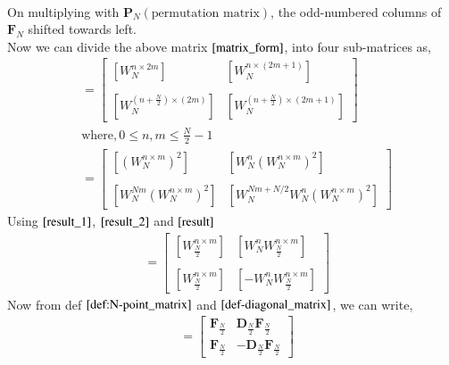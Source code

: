 \documentclass[journal,12pt,twocolumn]{IEEEtran}
\providecommand{\brak}[1]{\ensuremath{\left(#1\right)}}
\providecommand{\sbrak}[1]{\ensuremath{\left[#1\right]}}
\let\vec\mathbf
\numberwithin{equation}{section}
\renewcommand\thesection{\arabic{section}}
\begin{document}
\begin{enumerate}[label=\arabic*.,ref=\thesection.\theenumi]
\begin{align}
 \label{matrix_form}
\end{align}
On multiplying with $\vec{P}_{N} \brak{\text{permutation matrix}}$, the odd-numbered columns of $\vec{F}_{N}$ shifted towards left.\\
 Now we can divide the above matrix $\eqref{matrix_form}$, into four sub-matrices as,
   \begin{align}
   	           & = \begin{bmatrix}
                       \sbrak{W_{N}^{n\times 2m}} & \sbrak{W_{N}^{n\times\brak{2m + 1}}} \\ \\
                       \sbrak{W_{N}^{(n + \frac{N}{2}) \times (2m) }} & \sbrak{W_{N}^{(n + \frac{N}{2}) \times (2m + 1)}}
                    \end{bmatrix}\\
               & \text{where}, 0 \leq n,m \leq \frac{N}{2} - 1 \nonumber \\
               & = \begin{bmatrix}
               	        \sbrak{\brak{W_{N}^{n\times m}}^2} & \sbrak{W_{N}^{n}\brak{W_{N}^{n\times m}}^2} \\ \\
               			\sbrak{W_{N}^{Nm}\brak{W_{N}^{n \times m}}^2} & \sbrak{W_{N}^{Nm + N/2}W_{N}^{n}\brak{W_{N}^{n \times m}}^2}
               	   \end{bmatrix}
   \end{align}
Using $\eqref{result_1}$, $\eqref{result_2}$ and $\eqref{result}$
 \begin{align}
 	  & =  \begin{bmatrix}
 	  	       \sbrak{W_{\frac{N}{2}}^{n\times m}} & \sbrak{W_{N}^{n}W_{\frac{N}{2}}^{n\times m}}\\ \\
 	  	       \sbrak{W_{\frac{N}{2}}^{n\times m}} & \sbrak{-W_{N}^{n}W_{\frac{N}{2}}^{n\times m}}
 	       \end{bmatrix}
 \end{align}
Now from def $\eqref{def:N-point_matrix}$ and $\eqref{def-diagonal_matrix}$, we can write,
  \begin{align}
  	   & =  \begin{bmatrix}
  	  	      \vec{F}_{\frac{N}{2}} &\vec{D}_{\frac{N}{2}}\vec{F}_{\frac{N}{2}}\\
  	  	       \vec{F}_{\frac{N}{2}}& -\vec{D}_{\frac{N}{2}}\vec{F}_{\frac{N}{2}}
  	        \end{bmatrix} \\

\end{align}
\end{enumerate}
\end{document}
